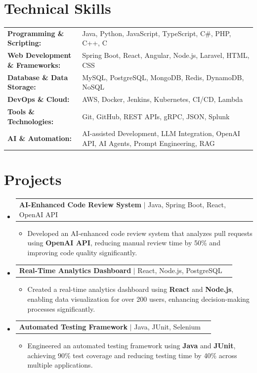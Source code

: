 \documentclass[letterpaper,10pt]{article}
\makeatletter
\newcommand{\resumeItem}[1]{
  \item{\fontsize{8pt}{9pt}\selectfont
    #1 \vspace{-3pt}
  }
}
\newcommand{\resumeProjectHeading}[2]{
    \item
    \begin{tabular*}{1.001\textwidth}{l@{\extracolsep{\fill}}r}
      \fontsize{8.5pt}{10pt}#1 & \textbf{\fontsize{8.5pt}{10pt} #2}\\
    \end{tabular*}\vspace{-7pt}
}
\newcommand{\resumeSubHeadingListStart}{\begin{itemize}[leftmargin=0pt, label={}]}
\newcommand{\resumeSubHeadingListEnd}{\end{itemize}}
\newcommand{\resumeItemListStart}{\begin{itemize}[leftmargin=*]}
\newcommand{\resumeItemListEnd}{\end{itemize}\vspace{-5pt}}
\makeatother
\begin{document}
\section{Technical Skills}
        \vspace{-14pt}
        \begin{table}[h]
            \fontsize{8pt}{9pt}\selectfont
            \begin{tabular}{p{0.3\linewidth} p{0.7\linewidth}}
                \textbf{Programming \& Scripting:} & Java, Python, JavaScript, TypeScript, C\#, PHP, C++, C \\
                \textbf{Web Development \& Frameworks:} & Spring Boot, React, Angular, Node.js, Laravel, HTML, CSS \\
                \textbf{Database \& Data Storage:} & MySQL, PostgreSQL, MongoDB, Redis, DynamoDB, NoSQL \\
                \textbf{DevOps \& Cloud:} & AWS, Docker, Jenkins, Kubernetes, CI/CD, Lambda \\
                \textbf{Tools \& Technologies:} & Git, GitHub, REST APIs, gRPC, JSON, Splunk \\
                \textbf{AI \& Automation:} & AI-assisted Development, LLM Integration, OpenAI API, AI Agents, Prompt Engineering, RAG \\
            \end{tabular}
        \end{table}
 \vspace{-18pt}

\section{Projects}
    \vspace{-5pt}
    \resumeSubHeadingListStart
          \resumeProjectHeading
            {\textbf{AI-Enhanced Code Review System} $|$ Java, Spring Boot, React, OpenAI API}{}
            \resumeItemListStart
                \resumeItem{Developed an AI-enhanced code review system that analyzes pull requests using \textbf{OpenAI API}, reducing manual review time by 50\% and improving code quality significantly.}
            \resumeItemListEnd
        \vspace{-12pt}
    
        \resumeProjectHeading
            {\textbf{Real-Time Analytics Dashboard} $|$ React, Node.js, PostgreSQL}{}
        \resumeItemListStart
                \resumeItem{Created a real-time analytics dashboard using \textbf{React} and \textbf{Node.js}, enabling data visualization for over 200 users, enhancing decision-making processes significantly.}
        \resumeItemListEnd
      \vspace{-12pt}
      \resumeProjectHeading
        {\textbf{Automated Testing Framework} $|$ Java, JUnit, Selenium}{}
    \resumeItemListStart
            \resumeItem{Engineered an automated testing framework using \textbf{Java} and \textbf{JUnit}, achieving 90\% test coverage and reducing testing time by 40\% across multiple applications.}
    \resumeItemListEnd
    \resumeSubHeadingListEnd
\end{document}

